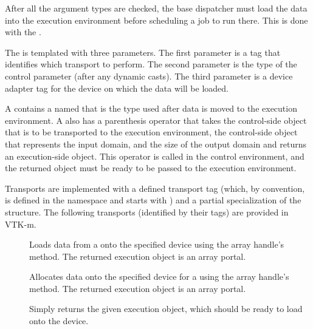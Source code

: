 
After all the argument types are checked, the base dispatcher must load the
data into the execution environment before scheduling a job to run
there. This is done with the  .

The   is templated with three
parameters. The first parameter is a tag that identifies which transport to
perform. The second parameter is the type of the control parameter (after any
dynamic casts). The third parameter is a device adapter tag for the device
on which the data will be loaded.

A  contains a  named  that is the type used after data is moved to the execution environment.
A  also has a  parenthesis operator that takes the control-side object that is to be transported to the execution environment, the control-side object that represents the input domain, and the size of the output domain and returns an execution-side object.
This operator is called in the control environment, and the returned object must be ready to be passed to the execution environment.

Transports are implemented with a defined transport tag (which, by
convention, is defined in the \vtkmcontarg{} namespace and starts with
) and a partial specialization of the
 structure. The following transports (identified by
their tags) are provided in VTK-m.

\begin{description}
\item[] 
  Loads data from a  onto the specified device using
  the array handle's  method. The returned
  execution object is an array portal.
\item[] 
  Allocates data onto the specified device for a 
  using the array handle's  method. The returned
  execution object is an array portal.
\item[]
   Simply returns the given execution
  object, which should be ready to load onto the device.
\end{description}

